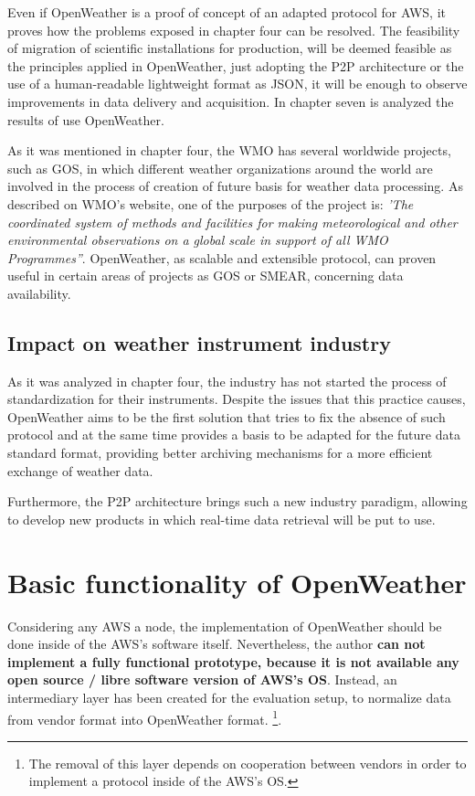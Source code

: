 Even if OpenWeather is a proof of concept of an adapted protocol for \gls{AWS}, it proves how the problems exposed in chapter four can be resolved. The feasibility of migration of scientific installations for production, will be deemed feasible as the principles applied in OpenWeather, just adopting the \gls{P2P} architecture or the use of a human-readable lightweight format as \gls{JSON}, it will be enough to observe improvements in data delivery and acquisition. In chapter seven is analyzed the results of use OpenWeather.

As it was mentioned in chapter four, the \gls{WMO} has several worldwide projects, such as \gls{GOS}, in which different weather organizations around the world are involved in the process of creation of future basis for weather data processing. As described on \gls{WMO}'s website\cite{WMO}, one of the purposes of the project is: \emph{'The coordinated system of methods and facilities for making meteorological and other environmental observations on a global scale in support of all WMO Programmes''}. OpenWeather, as scalable and extensible protocol, can proven useful in certain areas of projects as \gls{GOS} or SMEAR\cite{SMEAR}, concerning data availability.

\subsection{Impact on weather instrument industry}

As it was analyzed in chapter four, the industry has not started the process of standardization for their instruments. Despite the issues that this practice causes, OpenWeather aims to be the first solution that tries to fix the absence of such protocol and at the same time provides a basis to be adapted for the future data standard format, providing better archiving mechanisms for a more efficient exchange of weather data.

Furthermore, the \gls{P2P} architecture brings such a new industry paradigm, allowing to develop new products in which real-time data retrieval will be put to use.

\section{Basic functionality of OpenWeather}\label{5.2}

Considering any \gls{AWS} a node, the implementation of OpenWeather should be done inside of the \gls{AWS}'s software itself. Nevertheless, the author \textbf{can not implement a fully functional prototype, because it is not available any open source / libre software version of \gls{AWS}'s \gls{OS}}. Instead, an intermediary layer has been created for the evaluation setup, to normalize data from vendor format into OpenWeather format.
\footnote{The removal of this layer depends on cooperation between vendors in order to implement a protocol inside of the \gls{AWS}'s \gls{OS}.}.

